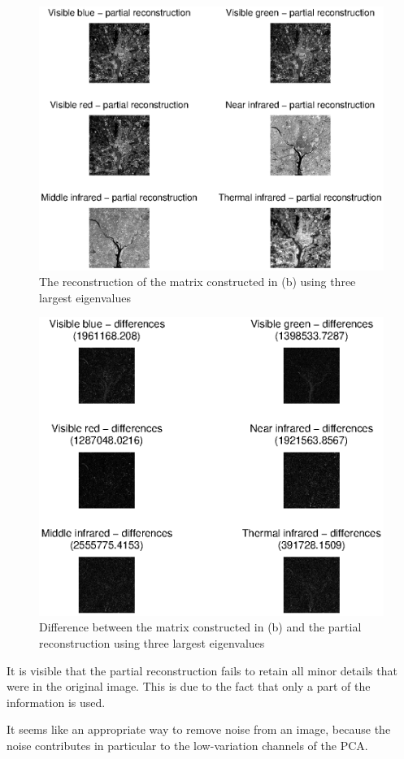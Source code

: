 \begin{figure}[htb]
 \centering
 \includegraphics[width=\linewidth]{partial_recon_pca.eps}
 \caption{The reconstruction of the matrix constructed in (b) using three largest eigenvalues}
 \label{fig:partial_recon_pca}
\end{figure}

\begin{figure}[htb]
 \centering
 \includegraphics[width=\linewidth]{differences_pca.eps}
 \caption{Difference between the matrix constructed in (b) and the partial reconstruction using three largest eigenvalues}
 \label{fig:differences_pca}
\end{figure}

It is visible that the partial reconstruction fails to retain all minor details that were in the original image.
This is due to the fact that only a part of the information is used.

It seems like an appropriate way to remove noise from an image, because the noise contributes in particular to the low-variation channels of the PCA. 

\clearpage